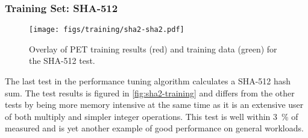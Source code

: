 \newpage

\subsubsection{Training Set: SHA-512}
\begin{figure}[htb]
    \centering
    \texttt{[image: figs/training/sha2-sha2.pdf]}
    \caption{Overlay of PET training results (red) and training data (green) for
    the SHA-512 test.}
    \label{fig:sha2-training}
\end{figure}

The last test in the performance tuning algorithm calculates a
SHA-512 hash sum. The test results is figured in \autoref{fig:sha2-training} and
differs from the other tests by being more memory intensive at the same time
as it is an extensive user of both multiply and simpler integer operations. This
test is well within 3~\% of measured and is yet another example of good
performance on general workloads.
